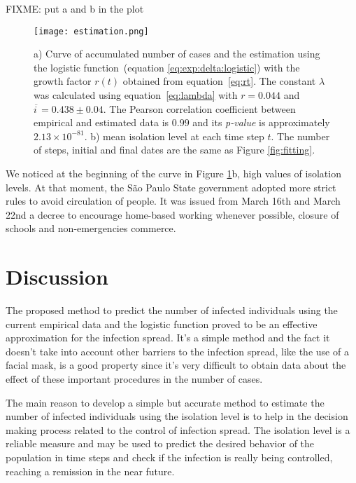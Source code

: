 \documentclass[review]{elsarticle}
\begin{document}
FIXME: put a and b in the plot
\begin{figure}
\centering
\texttt{[image: estimation.png]}
\caption{a) Curve of accumulated number of cases 
and the estimation using the logistic 
function~(equation \ref{eq:exp:delta:logistic}) 
with the growth factor $r(t)$ obtained from equation~\ref{eq:rt}. 
The constant $\lambda$ was calculated using equation~\ref{eq:lambda} with 
$r=0.044$ and \hbox{$\overline{i\,} = 0.438\pm 0.04$}. 
The Pearson correlation coefficient between empirical and estimated data is $0.99$ 
and its {\it p-value\/} is approximately \hbox{$2.13\times 10^{-81}$}. 
b) mean isolation level at each time step $t$. 
The number of steps, initial and final dates are 
the same as Figure \ref{fig:fitting}.}
\label{fig:estimation}
\end{figure}

We noticed at the beginning of the curve in Figure \ref{fig:estimation}b, high values of isolation levels. 
At that moment, the São Paulo State government adopted more strict rules to avoid circulation of people. 
It was issued from March 16th and March 22nd a decree to encourage home-based working whenever possible, 
closure of schools and non-emergencies commerce\cite{Cruz2020}.

\section{Discussion}

The proposed method to predict the number of infected individuals 
using the current empirical data and the logistic function proved 
to be an effective approximation for the infection spread. 
It’s a simple method and the fact it doesn’t take into account 
other barriers to the infection spread, like the use of a facial mask, 
is a good property since it’s very difficult to obtain data about 
the effect of these important procedures in the number of cases.

The main reason to develop a simple but accurate method to estimate 
the number of infected individuals using the isolation level is to help 
in the decision making process related to the control of infection spread. 
The isolation level is a reliable measure and may be used to predict 
the desired behavior of the population in time steps and check if the infection 
is really being controlled, reaching a remission in the near future.
\end{document}
